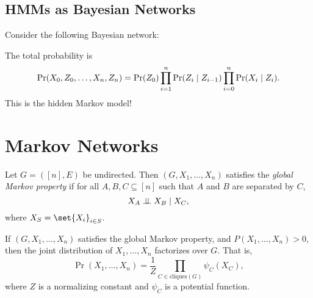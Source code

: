 \subsection[HMMs]{HMMs as Bayesian Networks} \label{sec:bayes_networks:hmms}
Consider the following Bayesian network:
\begin{center}
\end{center}
The total probability is \[
    \Pr(X_0, Z_0, \dots, X_n, Z_n)
        = \Pr(Z_0)
            \prod_{i=1}^n \Pr(Z_i \mid Z_{i-1})
            \prod_{i=0}^n \Pr(X_i \mid Z_i).
\] This is the hidden Markov model!

\section{Markov Networks} \label{sec:markov_networks}
\begin{definition*} \label{def:markoc:gmp}
    Let $G = ([n], E)$ be undirected.
    Then $(G, X_1, \dots, X_n)$ satisfies the \emph{global Markov property}
    if for all $A, B, C \subseteq [n]$ such that $A$ and $B$ are separated
    by $C$, \[
        X_A \mathrel{\bot\!\!\!\bot} X_B \mid X_C,
    \] where $X_S = \set{X_i}_{i \in S}$.
\end{definition*}

\begin{theorem} \label{thm:markov_networks:hct}
    If $(G, X_1, \dots, X_n)$ satisfies the global Markov property,
    and $P(X_1, \dots, X_n) > 0$,
    then the joint distribution of $X_1, \dots, X_n$ factorizes over $G$.
    That is, \[
        \Pr(X_1, \dots, X_n)
            = \frac1Z \prod_{C \in \text{cliques}(G)} \psi_C(X_C),
    \] where $Z$ is a normalizing constant and $\psi_C$ is a potential
    function.
\end{theorem}

